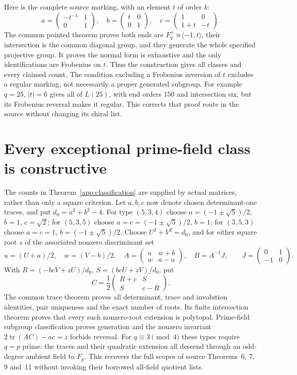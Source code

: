 \documentclass[11pt,a4paper]{article}
\begin{document}
Here is the complete source marking, with an element $t$ of order $k$:
\[
 a=\begin{pmatrix}-t^{-1}&1\\0&1\end{pmatrix},\quad
 b=\begin{pmatrix}t&0\\0&1\end{pmatrix},\quad
 c=\begin{pmatrix}1&0\\1+t&-t\end{pmatrix}.
\]
The common pointed theorem proves both ends are
$F_q^+\rtimes\langle-1,t\rangle$, their intersection is the common
diagonal group, and they generate the whole specified projective group.
It proves the normal form is exhaustive and the only identifications
are Frobenius on $t$. Thus the construction gives all classes and every
claimed count. The condition excluding a Frobenius inversion of $t$
excludes a regular marking, not necessarily a proper generated subgroup.
For example $q=25$, $|t|=6$ gives all of $L(25)$, with end orders $150$
and intersection six, but its Frobenius reversal makes it regular.
This corrects that proof route in the source without changing its chiral list.

\section{Every exceptional prime-field class is constructive}
The counts in Theorem~\ref{app:classification} are supplied by actual
matrices, rather than only a square criterion. Let $a,b,c$ now denote
chosen determinant-one traces, and put $d_0=a^2+b^2-4$.
For type $(5,3,4)$ choose $a=(-1\pm\sqrt5)/2$, $b=1$, $c=\sqrt2$;
for $(5,3,5)$ choose $a=c=(-1\pm\sqrt5)/2$, $b=1$;
for $(3,5,3)$ choose $a=c=1$, $b=(-1\pm\sqrt5)/2$.
Choose $U^2+V^2=d_0$, and for either square root $z$ of the associated
nonzero discriminant set
\[
 u=(U+a)/2,\quad w=(V-b)/2,\quad
 A=\begin{pmatrix}u&w+b\\w&a-u\end{pmatrix},\quad B=A^{-1}J,
 \qquad J=\begin{pmatrix}0&1\\-1&0\end{pmatrix}.
\]
With $R=(-bcV+zU)/d_0$, $S=(bcU+zV)/d_0$, put
\[
 C=\frac12\begin{pmatrix}R+c&S\\S&c-R\end{pmatrix}.
\]
The common trace theorem proves all determinant, trace and involution
identities, pair uniqueness and the exact number of roots. Its finite
intersection theorem proves that every such nonzero-root extension is
polytopal. Prime-field subgroup classification proves generation and
the nonzero invariant $2\operatorname{tr}(AC)-ac=z$ forbids reversal.
For $q\equiv3\pmod4$ these types require $q=p$ prime: the traces and
their quadratic extension all descend through an odd-degree ambient
field to $F_p$. This recovers the full scopes of source Theorems~6,
7, 9 and~11 without invoking their borrowed all-field quotient lists.
\end{document}
